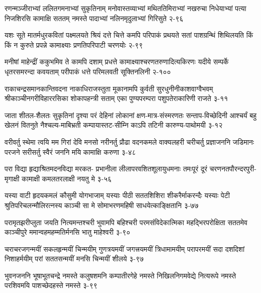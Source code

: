 \annofourlineindentedshloka
{रणन्मञ्जीराभ्यां ललितगमनाभ्यां सुकृतिनाम्}
{मनोवास्तव्याभ्यां मथिततिमिराभ्यां नखरुचा}
{निधेयाभ्यां पत्या निजशिरसि कामाक्षि सततम्}
{नमस्ते पादाभ्यां नलिनमृदुलाभ्यां गिरिसुते}
{२-९६}

\annofourlineindentedshloka
{यशः सूते मातर्मधुरकवितां पक्ष्मलयते}
{श्रियं दत्ते चित्ते कमपि परिपाकं प्रथयते}
{सतां पाशग्रन्थिं शिथिलयति किं किं न कुरुते}
{प्रपन्ने कामाक्ष्याः प्रणतिपरिपाटी चरणयोः}
{२-९९}


\annofourlineindentedshloka
{मनीषां माहेन्द्रीं ककुभमिव ते कामपि दशाम्}
{प्रधत्ते कामाक्ष्याश्चरणतरुणादित्यकिरणः}
{यदीये सम्पर्के धृतरसमरन्दा कवयताम्}
{परीपाकं धत्ते परिमलवती सूक्तिनलिनी}
{२-१००}

\annofourlineindentedshloka
{राकाचन्द्रसमानकान्तिवदना नाकाधिराजस्तुता}
{मूकानामपि कुर्वती सुरधुनीनीकाशवाग्वैभवम्}
{श्रीकाञ्चीनगरीविहाररसिका शोकापहन्त्री सताम्}
{एका पुण्यपरम्परा पशुपतेराकारिणी राजते}
{३-११}

\annofourlineindentedshloka
{जाता शीतल-शैलतः सुकृतिनां दृश्या परं देहिनां}
{लोकानां क्षण-मात्र-संस्मरणतः सन्ताप-विच्छेदिनी}
{आश्चर्यं बहु खेलनं वितनुते नैश्चल्य-माबिभ्रती}
{कम्पायास्तट-सीम्नि काऽपि तटिनी कारुण्य-पाथोमयी}
{३-१२}

\annofourlineindentedshloka
{वरीवर्तु स्थेमा त्वयि मम गिरां देवि मनसो}
{नरीनर्तु प्रौढा वदनकमले वाक्यलहरी}
{चरीचर्तु प्रज्ञाजननि जडिमानः परजने}
{सरीसर्तु स्वैरं जननि मयि कामाक्षि करुणा}
{३-४८}

\annofourlineindentedshloka
{परा विद्या हृद्याश्रितमदनविद्या मरकत-}
{प्रभानीला लीलापरवशितशूलायुधमनाः}
{तमःपूरं दूरं चरणनतपौरन्दरपुरी-}
{मृगाक्षी कामाक्षी कमलतरलाक्षी नयतु मे}
{३-५६}

\annofourlineindentedshloka
{यस्या वाटी हृदयकमलं कौसुमी योगभाजाम्}
{यस्याः पीठी सततशिशिरा शीकरैर्माकरन्दैः}
{यस्याः पेटी श्रुतिपरिचलन्मौलिरत्नस्य काञ्ची}
{सा मे सोमाभरणमहिषी साधयेत्काङ्क्षितानि}
{३-७७}

\annofourlineindentedshloka
{परामृतझरीप्लुता जयति नित्यमन्तश्चरी}
{भुवामपि बहिश्चरी परमसंविदेकात्मिका}
{महद्भिरपरोक्षिता सततमेव काञ्चीपुरे}
{ममान्वहमहम्मतिर्मनसि भातु माहेश्वरी}
{३-९०}

\annofourlineindentedshloka
{चराचरजगन्मयीं सकलहृन्मयीं चिन्मयीम्}
{गुणत्रयमयीं जगत्त्रयमयीं त्रिधामामयीम्}
{परापरमयीं सदा दशदिशां निशाहर्मयीम्}
{परां सततसन्मयीं मनसि चिन्मयीं शीलये}
{३-९७}

\annofourlineindentedshloka
{भुवनजननि भूषाभूतचन्द्रे नमस्ते}
{कलुषशमनि कम्पातीरगेहे नमस्ते}
{निखिलनिगमवेद्ये नित्यरूपे नमस्ते}
{परशिवमयि पाशच्छेदहस्ते नमस्ते}
{३-९९}

